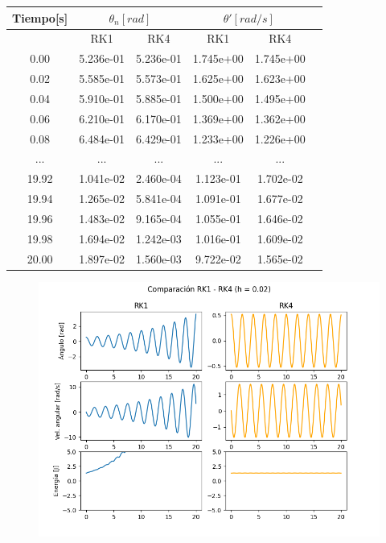 \documentclass[titlepage,a4paper]{article}
\begin{document}
\begin{center}
    \begin{tabular}{| c | c | c | c | c | c|}
        \hline
       Tiempo[s] &\multicolumn{2}{|c|}{$\theta_n[rad]$} &\multicolumn{2}{|c|}{$\theta'[rad/s]$} \tabularnewline
        \hline
        &RK1&RK4&RK1&RK4\\
        \hline
        0.00&5.236e-01&5.236e-01&1.745e+00&1.745e+00\\
        0.02&5.585e-01&5.573e-01&1.625e+00&1.623e+00\\
        0.04&5.910e-01&5.885e-01&1.500e+00&1.495e+00\\
        0.06&6.210e-01&6.170e-01&1.369e+00&1.362e+00\\
        0.08&6.484e-01&6.429e-01&1.233e+00&1.226e+00\\
        ...&...&...&...&...\\
        19.92&1.041e-02&2.460e-04&1.123e-01&1.702e-02\\
        19.94&1.265e-02&5.841e-04&1.091e-01&1.677e-02\\
        19.96&1.483e-02&9.165e-04&1.055e-01&1.646e-02\\
        19.98&1.694e-02&1.242e-03&1.016e-01&1.609e-02\\
        20.00&1.897e-02&1.560e-03&9.722e-02&1.565e-02\\
        \hline
    \end{tabular}
\end{center}

\begin{figure}[H]
    \centering
    \includegraphics[scale = 0.4]{noAmortiguado1.png}
    \caption{}
\end{figure}
\end{document}
